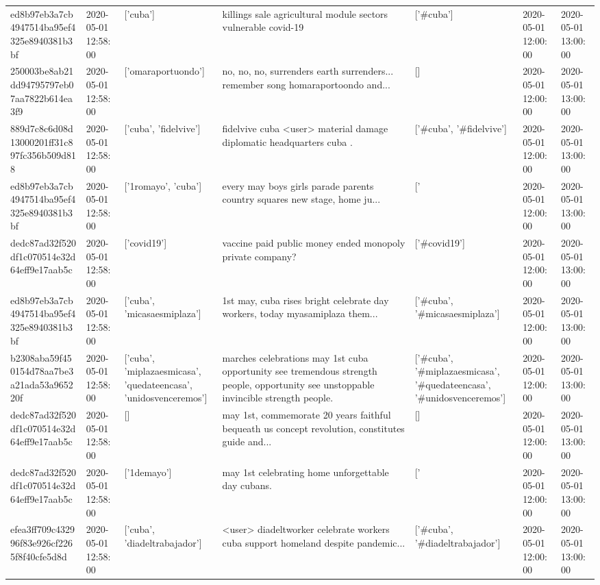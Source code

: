 \begin{tabular}{lllllll}
ed8b97eb3a7cb4947514ba95ef4325e8940381b3bf & 2020-05-01 12:58:00 & ['cuba'] & killings sale agricultural module sectors vulnerable covid-19 & ['#cuba'] & 2020-05-01 12:00:00 & 2020-05-01 13:00:00 \\
250003be8ab21dd94795797eb07aa7822b614ea3f9 & 2020-05-01 12:58:00 & ['omaraportuondo'] & no, no, no, surrenders earth surrenders... remember song homaraportoondo and... & [] & 2020-05-01 12:00:00 & 2020-05-01 13:00:00 \\
889d7c8c6d08d13000201ff31c897fc356b509d818 & 2020-05-01 12:58:00 & ['cuba', 'fidelvive'] & fidelvive cuba️ <user> material damage diplomatic headquarters cuba️ . & ['#cuba', '#fidelvive'] & 2020-05-01 12:00:00 & 2020-05-01 13:00:00 \\
ed8b97eb3a7cb4947514ba95ef4325e8940381b3bf & 2020-05-01 12:58:00 & ['1romayo', 'cuba'] & every may boys girls parade parents country squares new stage, home ju... & ['#1romayo', '#cuba'] & 2020-05-01 12:00:00 & 2020-05-01 13:00:00 \\
dedc87ad32f520df1c070514e32d64eff9e17aab5c & 2020-05-01 12:58:00 & ['covid19'] & vaccine paid public money ended monopoly private company? & ['#covid19'] & 2020-05-01 12:00:00 & 2020-05-01 13:00:00 \\
ed8b97eb3a7cb4947514ba95ef4325e8940381b3bf & 2020-05-01 12:58:00 & ['cuba', 'micasaesmiplaza'] & 1st may, cuba rises bright celebrate day workers, today myasamiplaza them... & ['#cuba', '#micasaesmiplaza'] & 2020-05-01 12:00:00 & 2020-05-01 13:00:00 \\
b2308aba59f450154d78aa7be3a21ada53a965220f & 2020-05-01 12:58:00 & ['cuba', 'miplazaesmicasa', 'quedateencasa', 'unidosvenceremos'] & marches celebrations may 1st cuba opportunity see tremendous strength people, opportunity see unstoppable invincible strength people. & ['#cuba', '#miplazaesmicasa', '#quedateencasa', '#unidosvenceremos'] & 2020-05-01 12:00:00 & 2020-05-01 13:00:00 \\
dedc87ad32f520df1c070514e32d64eff9e17aab5c & 2020-05-01 12:58:00 & [] & may 1st, commemorate 20 years faithful bequeath us concept revolution, constitutes guide and... & [] & 2020-05-01 12:00:00 & 2020-05-01 13:00:00 \\
dedc87ad32f520df1c070514e32d64eff9e17aab5c & 2020-05-01 12:58:00 & ['1demayo'] & may 1st celebrating home unforgettable day cubans. & ['#1demayo'] & 2020-05-01 12:00:00 & 2020-05-01 13:00:00 \\
efea3ff709c432996f83e926cf2265f8f40cfe5d8d & 2020-05-01 12:58:00 & ['cuba', 'diadeltrabajador'] & <user> diadeltworker celebrate workers cuba support homeland despite pandemic... & ['#cuba', '#diadeltrabajador'] & 2020-05-01 12:00:00 & 2020-05-01 13:00:00 \\

\end{tabular}
